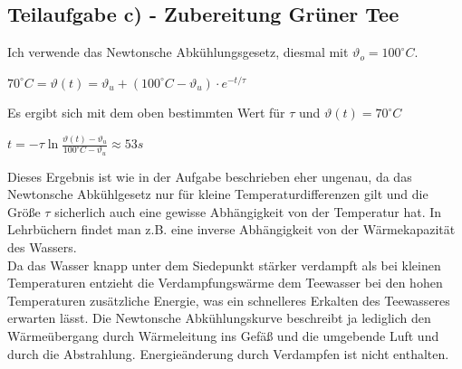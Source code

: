 \documentclass{article}
\begin{document}
\subsection*{Teilaufgabe c) - Zubereitung Grüner Tee}
Ich verwende das Newtonsche Abkühlungsgesetz, diesmal mit $\vartheta_o=100^\circ C$.
\begin{center}
	$70^\circ C = \vartheta (t) = \vartheta_u + (100^\circ C - \vartheta_u ) \cdot e^{-t/\tau}$ 
\end{center}
Es ergibt sich mit dem oben bestimmten Wert für $\tau$ und $\vartheta (t) = 70^\circ C$
\begin{center}
	$t=-\tau \ln{\frac{\vartheta (t) - \vartheta_u}{ 100^\circ C - \vartheta_u}} \approx 53 s$
\end{center}
Dieses Ergebnis ist wie in der Aufgabe beschrieben eher ungenau, da das Newtonsche Abkühlgesetz nur für kleine Temperaturdifferenzen gilt und 
die Größe $\tau$ sicherlich auch eine gewisse Abhängigkeit von der Temperatur hat. In Lehrbüchern findet man z.B. eine inverse Abhängigkeit von der Wärmekapazität des Wassers.  
\\
Da das Wasser knapp unter dem Siedepunkt stärker verdampft als bei kleinen Temperaturen entzieht die Verdampfungswärme dem Teewasser bei den hohen Temperaturen zusätzliche Energie, 
was ein schnelleres Erkalten des Teewasseres erwarten lässt. 
Die Newtonsche Abkühlungskurve beschreibt ja lediglich den Wärmeübergang durch Wärmeleitung ins Gefäß und die umgebende Luft und durch die Abstrahlung. 
Energieänderung durch Verdampfen ist nicht enthalten.      
\end{document}
